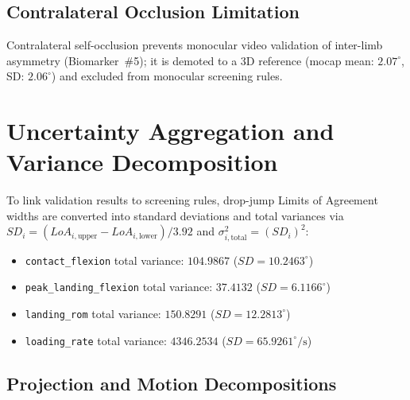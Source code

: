 \subsection{Contralateral Occlusion Limitation}
\label{sec:occlusion}

Contralateral self-occlusion prevents monocular video validation of inter-limb asymmetry (Biomarker~\#5); it is demoted to a 3D reference (mocap mean: $2.07^\circ$, SD: $2.06^\circ$) and excluded from monocular screening rules.


\section{Uncertainty Aggregation and Variance Decomposition}
\label{sec:uncertainty}

To link validation results to screening rules, drop-jump Limits of Agreement widths are converted into standard deviations and total variances via $SD_i = (LoA_{i,\text{upper}} - LoA_{i,\text{lower}})/3.92$ and $\sigma^2_{i,\text{total}} = (SD_i)^2$:
\begin{itemize}
  \item \texttt{contact\_flexion} total variance: $\mathbf{104.9867}$ ($SD = 10.2463^\circ$)
  \item \texttt{peak\_landing\_flexion} total variance: $\mathbf{37.4132}$ ($SD = 6.1166^\circ$)
  \item \texttt{landing\_rom} total variance: $\mathbf{150.8291}$ ($SD = 12.2813^\circ$)
  \item \texttt{loading\_rate} total variance: $\mathbf{4346.2534}$ ($SD = 65.9261^\circ/\text{s}$)
\end{itemize}

\subsection{Projection and Motion Decompositions}
\label{sec:variance-decomp}

